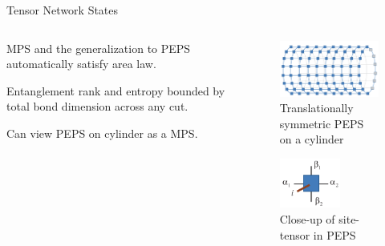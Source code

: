 \begin{frame}{Tensor Network States}
\vskip-1.5cm
\begin{columns}[T]
\begin{column}[T]{.5\textwidth}
\bi
\item MPS and the generalization to PEPS automatically satisfy area law.

\item Entanglement rank and entropy bounded by total bond dimension across any cut.

\item Can view PEPS on cylinder as a MPS.
\ei 
\end{column}
\begin{column}{.5\textwidth}
\vskip-0.7cm
\begin{figure}
\includegraphics[width=6cm]{diagrams/CylPEPS1.png}
\caption{Translationally symmetric PEPS on a cylinder}
\end{figure}
\vskip-0.6cm
\begin{figure}
\includegraphics[width=2cm]{diagrams/CylPEPS2.png}
\caption{Close-up of site-tensor in PEPS}
\end{figure}
\end{column}
\end{columns}
\end{frame}